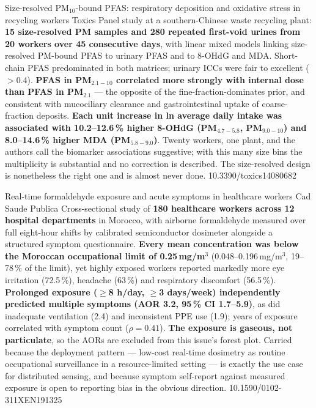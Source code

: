 \documentclass[10pt]{article}
\begin{document}
{Size-resolved PM$_{10}$-bound PFAS: respiratory deposition and oxidative stress in recycling workers}
{Toxics}
{Panel study at a southern-Chinese waste recycling plant: \textbf{15 size-resolved PM
samples and 280 repeated first-void urines from 20 workers over 45 consecutive days},
with linear mixed models linking size-resolved PM-bound PFAS to urinary PFAS and to
8-OHdG and MDA. Short-chain PFAS predominated in both matrices; urinary ICCs were fair to
excellent ($>$0.4). \textbf{PFAS in PM$_{2.1-10}$ correlated more strongly with internal
dose than PFAS in PM$_{2.1}$} --- the opposite of the fine-fraction-dominates prior, and
consistent with mucociliary clearance and gastrointestinal uptake of coarse-fraction
deposits. \textbf{Each unit increase in ln average daily intake was associated with
10.2--12.6\,\% higher 8-OHdG (PM$_{4.7-5.8}$, PM$_{9.0-10}$) and 8.0--14.6\,\% higher MDA
(PM$_{5.8-9.0}$)}. Twenty workers, one plant, and the authors call the biomarker
associations suggestive; with this many size bins the multiplicity is substantial and no
correction is described. The size-resolved design is nonetheless the right one and is
almost never done.}
{10.3390/toxics14080682}

{Real-time formaldehyde exposure and acute symptoms in healthcare workers}
{Cad Saude Publica}
{Cross-sectional study of \textbf{180 healthcare workers across 12 hospital departments}
in Morocco, with airborne formaldehyde measured over full eight-hour shifts by calibrated
semiconductor dosimeter alongside a structured symptom questionnaire. \textbf{Every mean
concentration was below the Moroccan occupational limit of 0.25\,mg/m$^3$}
(0.048--0.196\,mg/m$^3$, 19--78\,\% of the limit), yet highly exposed workers reported
markedly more eye irritation (72.5\,\%), headache (63\,\%) and respiratory discomfort
(56.5\,\%). \textbf{Prolonged exposure ($\geq$8 h/day, $\geq$3 days/week) independently
predicted multiple symptoms (AOR 3.2, 95\,\% CI 1.7--5.9)}, as did inadequate ventilation
(2.4) and inconsistent PPE use (1.9); years of exposure correlated with symptom count
($\rho = 0.41$). \textbf{The exposure is gaseous, not particulate}, so the AORs are
excluded from this issue's forest plot. Carried because the deployment pattern ---
low-cost real-time dosimetry as routine occupational surveillance in a resource-limited
setting --- is exactly the use case for distributed sensing, and because symptom
self-report against measured exposure is open to reporting bias in the obvious direction.}
{10.1590/0102-311XEN191325}
\end{document}
